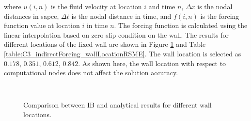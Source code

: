 where $u(i, n)$ is the fluid velocity at location $i$ and time $n$, $\Delta x$ is the nodal distances in sapce, $\Delta t$ is the nodal distance in time, and $f(i,n)$ is the forcing function value at location $i$ in time $n$. The forcing function is calculated using the linear interpolation based on zero slip condition on the wall. The results for different locations of the fixed wall are shown in Figure \ref{fig:C3_indirectForcing_wallLocation} and Table \ref{table:C3_indirectForcing_wallLocationRSME}. The wall location is selected as $0.178$, $0.351$, $0.612$, $0.842$. As shown here, the wall location with respect to computational nodes does not affect the solution accuracy.

\begin{figure}[H]
	\centering
	\quad
	\\
	\quad
	\caption{Comparison between IB and analytical results for different wall locations.}
	\label{fig:C3_indirectForcing_wallLocation}
\end{figure}


